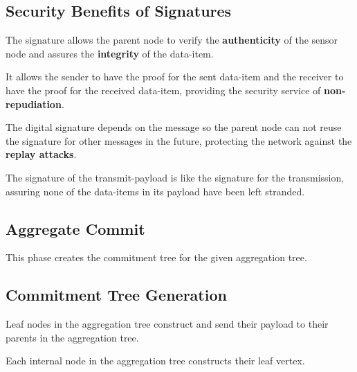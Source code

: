 \documentclass[%
  slidesonly,%
  semlayer%
  ]{seminar}                                  %
\begin{document}
\begin{slide}
    \subsection*{Security Benefits of Signatures}
      The signature allows the parent node to verify the \textbf{authenticity} of the sensor node and assures the \textbf{integrity} of the data-item.

      It allows the sender to have the proof for the sent data-item and the receiver to have the proof for the received data-item, providing the security service of \textbf{non-repudiation}.

      The digital signature depends on the message so the parent node can not reuse the signature for other messages in the future, protecting the network against the \textbf{replay attacks}.

      The signature of the transmit-payload is like the signature for the transmission, assuring none of the data-items in its payload have been left stranded.

      \vfill
      \clearpage

    \vfill%
    \clearpage

    \subsection*{Aggregate Commit}
      This phase creates the commitment tree for the given aggregation tree.

    \subsection*{Commitment Tree Generation}
    
      Leaf nodes in the aggregation tree construct and send their payload to their parents in the aggregation tree.  
      
      Each internal node in the aggregation tree constructs their leaf vertex.
  

\end{slide}
\end{document}
